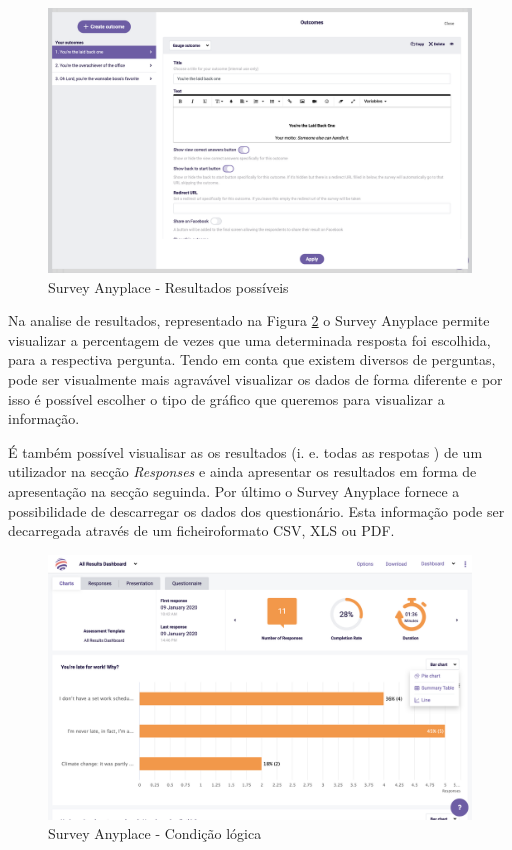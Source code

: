 \begin{figure}[ht!]
	\begin{center}
		\includegraphics[width=1\textwidth]{img/sap/outcome}
		\caption{Survey Anyplace - Resultados possíveis}
		\label{fig:sap-outcome}
	\end{center}
\end{figure}
\newpage

Na analise de resultados, representado na Figura \ref{fig:sap-results} o Survey Anyplace permite visualizar a percentagem de vezes que uma determinada resposta foi escolhida, para a respectiva pergunta. Tendo em conta que existem diversos de perguntas, pode ser visualmente mais agravável visualizar os dados de forma diferente e por isso é possível escolher o tipo de gráfico que queremos para visualizar a informação. 

É também possível visualisar as os resultados (i. e. todas as respotas ) de um utilizador na secção \textit{Responses} e ainda apresentar os resultados em forma de apresentação na secção seguinda. Por último o Survey Anyplace fornece a possibilidade de descarregar os dados dos questionário. Esta informação pode ser decarregada através de um ficheiroformato CSV, XLS ou PDF.

\newpage

\begin{figure}[ht!]
	\begin{center}
		\includegraphics[width=1\textwidth]{img/sap/results}
		\caption{Survey Anyplace - Condição lógica}
		\label{fig:sap-results}
	\end{center}
\end{figure}



